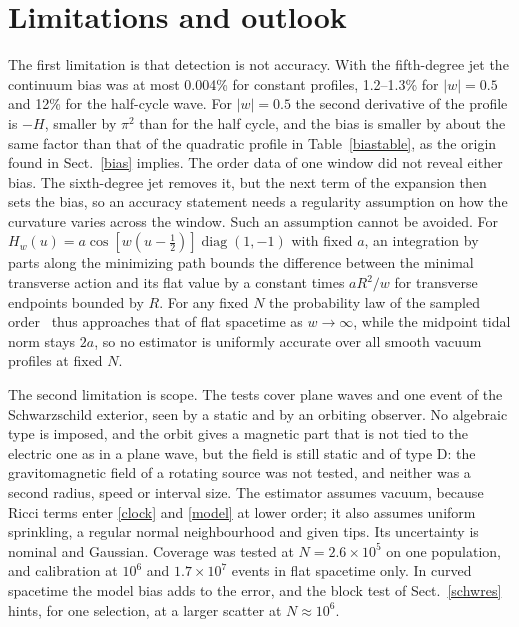 \documentclass[11pt,a4paper]{article}
\begin{document}
\section{Limitations and outlook}\label{limits}
The first limitation is that detection is not accuracy. With the
fifth-degree jet the continuum bias was at most 0.004\% for constant
profiles, 1.2--1.3\% for $|w|=0.5$ and 12\% for the half-cycle wave. For
$|w|=0.5$ the second derivative of the profile is $-H$, smaller by $\pi^2$
than for the half cycle, and the bias is smaller by about the same factor
than that of the quadratic profile in Table~\ref{biastable}, as the origin
found in Sect.~\ref{bias} implies. The order data of one window did not
reveal either bias. The sixth-degree jet removes it, but the next term of the expansion
then sets the bias, so an accuracy statement needs a regularity assumption on
how the curvature varies across the window. Such an assumption cannot be
avoided.
For $H_w(u)=a\cos[w(u-\tfrac12)]\operatorname{diag}(1,-1)$ with fixed $a$,
an integration by parts along the minimizing path bounds the difference
between the minimal transverse action and its flat value by a constant times
$aR^2/w$ for transverse endpoints bounded by $R$. For any fixed $N$ the
probability law of the sampled order~\cite{bombelli} thus approaches that of
flat spacetime as $w\to\infty$, while the midpoint tidal norm stays $2a$, so
no estimator is uniformly accurate over all smooth vacuum profiles at fixed
$N$.

The second limitation is scope. The tests cover plane waves and one event of
the Schwarzschild exterior, seen by a static and by an orbiting observer. No
algebraic type is imposed, and the orbit gives a magnetic part that is not
tied to the electric one as in a plane wave, but the field is still static
and of type D: the gravitomagnetic field of a rotating source was not tested,
and neither was a second radius, speed or interval size. The
estimator assumes vacuum, because Ricci terms enter \eqref{clock} and
\eqref{model} at lower order; it also assumes uniform sprinkling, a regular
normal neighbourhood and given tips. Its uncertainty is nominal and
Gaussian. Coverage was tested at $N=2.6\times10^5$ on one population, and
calibration at $10^6$ and $1.7\times10^7$ events in flat spacetime only. In
curved spacetime the model bias adds to the error, and the block test of
Sect.~\ref{schwres} hints, for one selection, at a larger scatter at
$N\approx10^6$.
\end{document}
